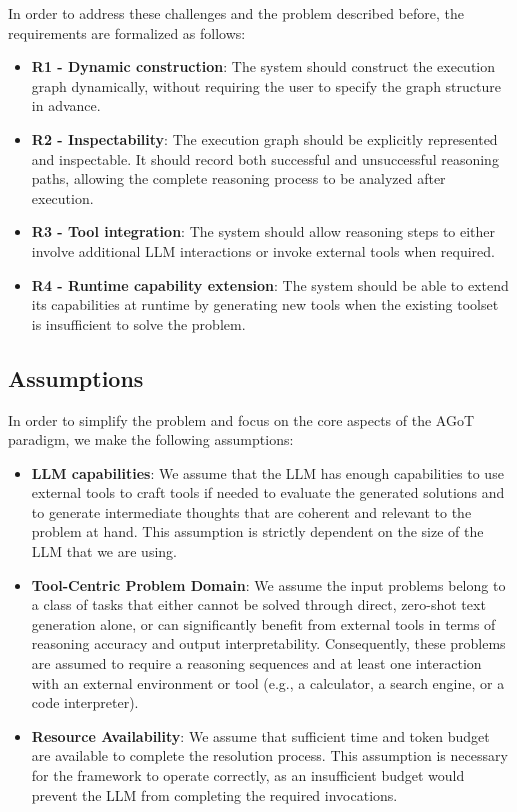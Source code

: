 \documentclass[12pt,a4paper,openright,twoside]{book}
\begin{document}
In order to address these challenges and the problem described before, the requirements are formalized as follows:

\begin{itemize}
    \item \textbf{R1 - Dynamic construction}: The system should construct the execution graph dynamically, without requiring the user to specify the graph structure in advance.
    \item \textbf{R2 - Inspectability}: The execution graph should be explicitly represented and inspectable. It should record both successful and unsuccessful reasoning paths, allowing the complete reasoning process to be analyzed after execution.
    \item \textbf{R3 - Tool integration}: The system should allow reasoning steps to either involve additional \ac{LLM} interactions or invoke external tools when required.
    \item \textbf{R4 - Runtime capability extension}: The system should be able to extend its capabilities at runtime by generating new tools when the existing toolset is insufficient to solve the problem.
\end{itemize}

\subsection{Assumptions}
In order to simplify the problem and focus on the core aspects of the \ac{AGoT} paradigm, we make the following assumptions:

\begin{itemize}
    \item \textbf{LLM capabilities}: We assume that the LLM has enough capabilities to use external tools to craft tools if needed to evaluate the generated solutions and to generate intermediate thoughts that are coherent and relevant to the problem at hand. This assumption is strictly dependent on the size of the LLM that we are using.
    \item \textbf{Tool-Centric Problem Domain}: We assume the input problems belong to a class of tasks that either cannot be solved through direct, zero-shot text generation alone, or can significantly benefit from external tools in terms of reasoning accuracy and output interpretability. Consequently, these problems are assumed to require a reasoning sequences and at least one interaction with an external environment or tool (e.g., a calculator, a search engine, or a code interpreter).    \
    \item \textbf{Resource Availability}: We assume that sufficient time and token budget are available to complete the resolution process. This assumption is necessary for the framework to operate correctly, as an insufficient budget would prevent the LLM from completing the required invocations.
\end{itemize}
\end{document}

